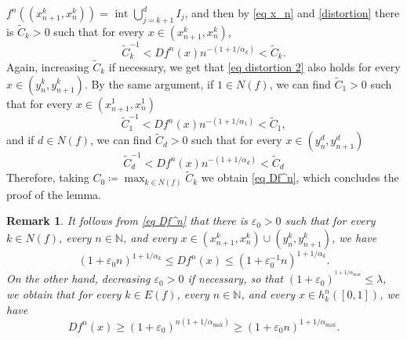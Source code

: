 \documentclass[10pt,a4paper]{amsart}
\numberwithin{equation}{section} %
\numberwithin{figure}{section} %
\newtheorem{rema}[prop]{Remark}
\newcommand{\N}{\mathbb{N}}
\renewcommand{\=}{\coloneqq}
\begin{document}
    $f^n((x_{n+1}^k,x_n^k))=\text{ int }\bigcup_{j=k+1}^{d}I_{j}$, and then by \eqref{eq x_n} and \eqref{distortion} there is $\widetilde{C}_k>0$ such that for every $x\in (x_{n+1}^k,x_n^k)$, 
    \begin{equation}\label{eq distortion 2}
        \widetilde{C}_k^{-1}<Df^n(x)n^{-(1+1/\alpha_k)}<\widetilde{C}_k.
    \end{equation}
    Again, increasing $\widetilde{C}_k$ if necessary, we get that \eqref{eq distortion 2} also holds for every $x\in(y_n^k,y_{n+1}^k)$. By the same argument, if $1\in N(f)$, we can find $\widetilde{C}_1>0$ such that for every $x\in (x_{n+1}^1,x_n^1)$
    \begin{equation*}
        \widetilde{C}_1^{-1}<Df^n(x)n^{-(1+1/\alpha_1)}<\widetilde{C}_1,
    \end{equation*}
    and if $d\in N(f)$, we can find $\widetilde{C}_d>0$ such that for every $x\in(y_{n}^d,y_{n+1}^d)$
    \begin{equation*}
        \widetilde{C}_d^{-1}<Df^n(x)n^{-(1+1/\alpha_d)}<\widetilde{C}_d
    \end{equation*}
    Therefore, taking $C_0\=\max_{k\in N(f)} \widetilde{C}_k$ we obtain \eqref{eq Df^n}, which concludes the proof of the lemma.
\endproof

\begin{rema}\label{rmk MP bound 1}
    It follows from \eqref{eq Df^n} that there is $\varepsilon_0>0$ such that for every $k\in N(f)$, every $n\in\N$, and every $x\in (x^k_{n+1},x^k_n)\cup(y^k_n,y^k_{n+1})$, we have
    \begin{equation}\label{MP bound}
    (1+\varepsilon_0 n)^{1+1/\alpha_k} \leq Df^n(x) \leq (1+\varepsilon_0^{-1} n)^{1+1/\alpha_k}.
\end{equation}
On the other hand, decreasing $\varepsilon_0>0$ if necessary, so that $(1+\varepsilon_0)^{^{1+1/\alpha_{\max}}}\leq \lambda$, we obtain that for every $k\in E(f)$, every $n\in \N$, and every $x\in h_k^n([0,1])$, we have
\begin{equation}
    Df^n(x) \geq (1+\varepsilon_0)^{n(1+1/\alpha_{\max})} \geq (1+\varepsilon_0 n)^{1+1/\alpha_{\max}}.
\end{equation}
\end{rema}
\end{document}
